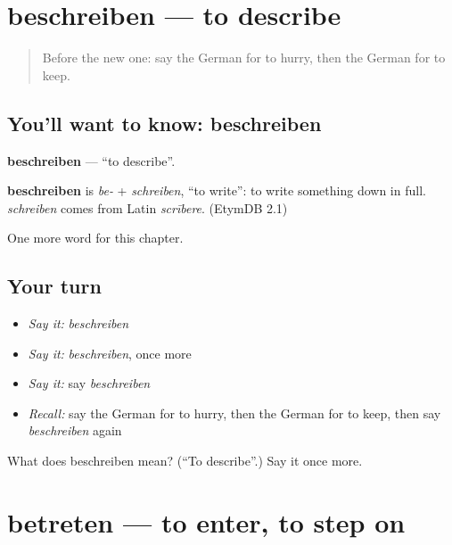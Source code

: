 \section[beschreiben]{beschreiben — to describe}

\label{lesson:GE-C176-beschreiben}



\begin{quote}
Before the new one: say the German for to hurry, then the German for to keep.
\end{quote}

\subsection*{You'll want to know: beschreiben}
\textbf{beschreiben} — \textquotedblleft{}to describe\textquotedblright{}.

\begin{cousinweb}
\textbf{beschreiben} is \emph{be-} + \emph{schreiben}, \textquotedblleft{}to write\textquotedblright{}: to write something down in full. \emph{schreiben} comes from Latin \emph{scrībere}. (EtymDB 2.1)
\end{cousinweb}

\begin{grammarlens}[title={What you've built}]
One more word for this chapter.
\end{grammarlens}

\subsection*{Your turn}
\begin{itemize}
\raggedright
  \item \emph{Say it:} \emph{beschreiben}
  \item \emph{Say it:} \emph{beschreiben}, once more
  \item \emph{Say it:} say \emph{beschreiben}
  \item \emph{Recall:} say the German for to hurry, then the German for to keep, then say \emph{beschreiben} again
\end{itemize}

\begin{tcolorbox}[breakable,colback=teal!4,colframe=teal!35!black,title={Before you move on}]
What does beschreiben mean? (\textquotedblleft{}To describe\textquotedblright{}.) Say it once more.
\end{tcolorbox}
\section[betreten]{betreten — to enter, to step on}

